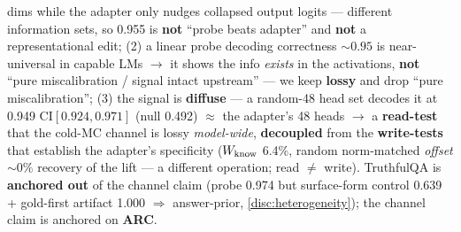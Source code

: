 \begin{table}[tbp]
\begin{threeparttable}
\begin{tablenotes}[flushleft]
dims while the adapter only nudges collapsed output logits --- different information
sets, so 0.955 is \textbf{not} ``probe beats adapter'' and \textbf{not} a
representational edit; (2) a linear probe decoding correctness ${\sim}0.95$ is
near-universal in capable LMs $\rightarrow$ it shows the info \emph{exists} in the
activations, \textbf{not} ``pure miscalibration / signal intact upstream'' --- we
keep \textbf{lossy} and drop ``pure miscalibration''; (3) the signal is
\textbf{diffuse} --- a random-48 head set decodes it at 0.949 CI$[0.924, 0.971]$
(null 0.492) ${\approx}$ the adapter's 48 heads $\rightarrow$ a \textbf{read-test}
that the cold-MC channel is lossy \emph{model-wide}, \textbf{decoupled} from the
\textbf{write-tests} that establish the adapter's specificity ($W_{\mathrm{know}}$ 6.4\%,
random norm-matched \emph{offset} ${\sim}0\%$ recovery of the lift --- a different
operation; read ${\neq}$ write). TruthfulQA is \textbf{anchored out} of the channel
claim (probe 0.974 but surface-form control 0.639 + gold-first artifact 1.000
$\Rightarrow$ answer-prior, \cref{disc:heterogeneity}); the channel claim is
anchored on \textbf{ARC}.
\end{tablenotes}
\end{threeparttable}
\end{table}

